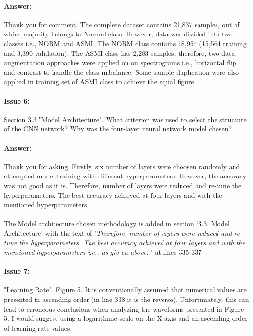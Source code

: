 \documentclass{article}
\begin{document}
\paragraph{Answer:}
Thank you for comment. The complete dataset contains 21,837 samples, out of which majority belongs to Normal class. However, data was divided into two classes i.e., NORM and ASMI. The NORM class contains 18,954 (15,564 training and 3,390 validation). The ASMI class has 2,283 samples, therefore, two data augmentation approaches were applied on on spectrograms i.e., horizontal flip and contrast to handle the class imbalance. Some sample duplication were also applied in training set of ASMI class to achieve the equal figure.  

\paragraph{Issue 6:}
\begin{displayquote}
Section 3.3 "Model Architecture". What criterion was used to select the structure of the CNN network? Why was the four-layer neural network model chosen?
\end{displayquote}

\paragraph{Answer:}
Thank you for asking. Firstly, six number of layers were choosen randomly and attempted model training with different hyperparameters. However, the accuracy was not good as it is. Therefore, number of layers were reduced and re-tune the hyperparameters. The best accuracy achieved at four layers and with the mentioned hyperparameters. \\\\

The Model architecture chosen methodology is added in section `3.3. Model Architecture' with the text of '\textit{Therefore, number of layers were reduced and re-tune the hyperparameters. The best accuracy achieved at four layers and with the mentioned hyperparameters i.e., as giv-en above. }' at lines 335-337

\paragraph{Issue 7:}
\begin{displayquote}
"Learning Rate". Figure 5. It is conventionally assumed that numerical values are presented in ascending order (in line 338 it is the reverse). Unfortunately, this can lead to erroneous conclusions when analyzing the waveforms presented in Figure 5. I would suggest using a logarithmic scale on the X axis and an ascending order of learning rate values. 
\end{displayquote}
\end{document}

